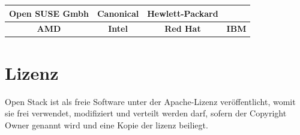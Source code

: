 \documentclass[a4paper,nochapterprefix,english,12pt]{scrreprt}
\begin{document}
\begin{table}[h]
\begin{tabular}{|c|c|c|c}
\hline
\textbf{Open  SUSE Gmbh} & \textbf{Canonical} & \textbf{Hewlett-Packard} &                                 \\ \hline
\textbf{AMD}             & \textbf{Intel}     & \textbf{Red Hat}         &\textbf{IBM} 					   \\ \hline
\end{tabular}
\end{table} \cite{RS-WikiEntry}\citep{OS-WikiEntry}
\section{Lizenz}
Open Stack ist als freie Software unter der Apache-Lizenz veröffentlicht, womit sie frei verwendet, modifiziert und verteilt werden darf, sofern der Copyright Owner genannt wird und eine Kopie der lizenz beiliegt.\citep{OS-WikiEntry}

\newpage
\end{document}
